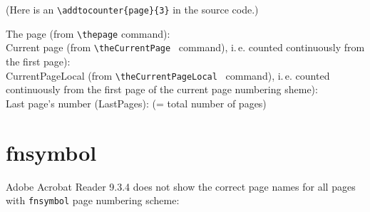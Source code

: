 \documentclass[british]{article}
\def\pagesLTSexampleArabic{3}
\begin{document}
(Here is an \texttt{\textbackslash addtocounter\{page\}\{\pagesLTSexampleArabic\}}
in the source code.)\\
\addtocounter{page}{\pagesLTSexampleArabic}

\noindent The page (from \texttt{\textbackslash thepage} command): \thepage \\

\noindent Current page (from \texttt{\textbackslash theCurrentPage}\ %
command), i.\,e. counted continuously from the first page): \theCurrentPage \\

\noindent CurrentPageLocal (from \texttt{\textbackslash theCurrentPageLocal}\ %
command), i.\,e. counted continuously from the first page of the
current page numbering sheme): \theCurrentPageLocal\\

\noindent Last page's number (LastPages): 
(= total number of pages)\\

\lipsum[1-7]

\newpage


\section{fnsymbol}

Adobe Acrobat Reader 9.3.4 does not show the correct page names
for all pages with \texttt{fnsymbol} page numbering scheme:
\end{document}
